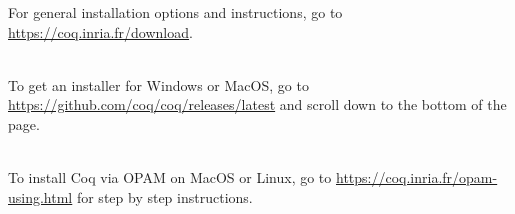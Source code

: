 
For general installation options and instructions, go to
\url{https://coq.inria.fr/download}.

~\\
To get an installer for Windows or MacOS, go to 
\url{https://github.com/coq/coq/releases/latest}
and scroll down to the bottom of the page.

~\\
To install Coq via OPAM on MacOS or Linux, go to 
\url{https://coq.inria.fr/opam-using.html}
for step by step instructions.
